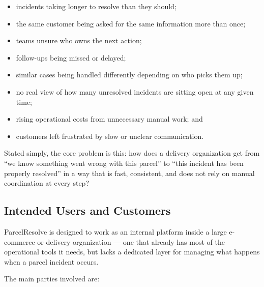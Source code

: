 \documentclass[11pt,a4paper]{article}
\begin{document}
\begin{itemize}
    \item incidents taking longer to resolve than they should;
    \item the same customer being asked for the same information more
    than once;
    \item teams unsure who owns the next action;
    \item follow-ups being missed or delayed;
    \item similar cases being handled differently depending on who
    picks them up;
    \item no real view of how many unresolved incidents are sitting
    open at any given time;
    \item rising operational costs from unnecessary manual work; and
    \item customers left frustrated by slow or unclear communication.
\end{itemize}

Stated simply, the core problem is this: how does a delivery
organization get from ``we know something went wrong with this
parcel'' to ``this incident has been properly resolved'' in a way
that is fast, consistent, and does not rely on manual coordination at
every step?


\subsection{Intended Users and Customers}

ParcelResolve is designed to work as an internal platform inside a
large e-commerce or delivery organization --- one that already has
most of the operational tools it needs, but lacks a dedicated layer
for managing what happens when a parcel incident occurs.

The main parties involved are:
\end{document}
